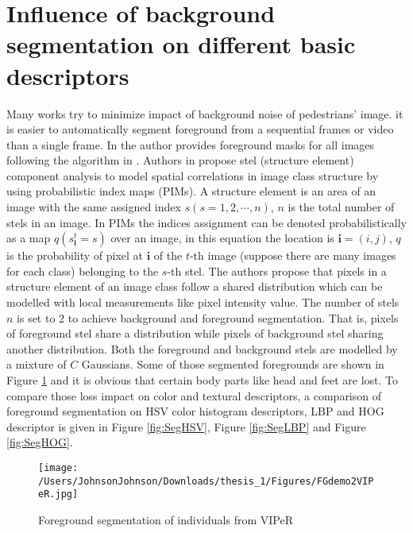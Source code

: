 \section{Influence of background segmentation on different basic descriptors}
Many works try to minimize impact of background noise of pedestrians' image. it is easier to automatically segment foreground from a sequential frames or video than a single frame. In \cite{SDALF} the author provides foreground masks for all images following the algorithm in \cite{STEL}. Authors in \cite{STEL} propose stel (structure element) component analysis to model spatial correlations in image class structure by using probabilistic index maps (PIMs). A structure element is an area of an image with the same assigned index $s(s=1,2,\cdots,n)$, $n$ is the total number of stels in an image. In PIMs the indices assignment can be denoted probabilistically as a map $q(s_{\bm{i}}^t=s)$ over an image, in this equation the location is $\bm{i} = (i,j)$, $q$ is the probability of pixel at $\bm{i}$ of the $t$-th image (suppose there are many images for each class) belonging to the $s$-th stel. The authors propose that pixels in a structure element of an image class follow a shared distribution which can be modelled with local measurements like pixel intensity value. The number of stels $n$ is set to 2 to achieve background and foreground segmentation. That is, pixels of foreground stel share a distribution while pixels of background stel sharing another distribution. Both the foreground and background stels are modelled by a mixture of $C$ Gaussians. Some of those segmented foregrounds are shown in Figure \ref{VIPeRFGs} and it is obvious that certain body parts like head and feet are lost. To compare those loss impact on color and textural descriptors, a comparison of foreground segmentation on HSV color histogram descriptors, LBP and HOG descriptor is given in Figure \ref{fig:SegHSV}, Figure \ref{fig:SegLBP} and Figure \ref{fig:SegHOG}. 


\begin{figure}[H]
\centering
\texttt{[image: /Users/JohnsonJohnson/Downloads/thesis\_1/Figures/FGdemo2VIPeR.jpg]}
\caption{Foreground segmentation of individuals from VIPeR }
\label{VIPeRFGs}
\vspace{0em}
\end{figure} 

